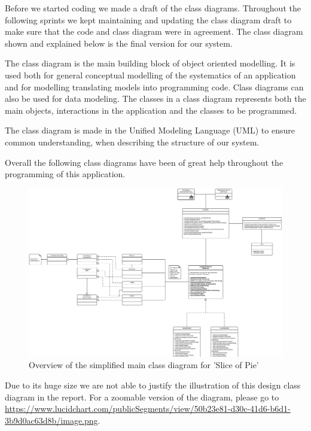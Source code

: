 Before we started coding we made a draft of the class diagrams. Throughout the following sprints we kept maintaining and updating the class diagram
draft to make sure that the code and class diagram were in agreement. The class diagram shown and explained below is the final version for our
system.

The class diagram is the main building block of object oriented modelling. It is used both for general conceptual modelling of the systematics 
of an application and for modelling translating models into programming code. Class diagrams can also be used for data modeling. The classes in a 
class diagram represents both the main objects, interactions in the application and the classes to be programmed.

The class diagram is made in the Unified Modeling Language (UML) to ensure common understanding, when describing the structure of our system.

Overall the following class diagrams have been of great help throughout the programming of this application.

\begin{figure}[htb]
    \begin{center}
        \includegraphics[width=1\textwidth]{Software_design/graphics/mainClassDiagram.png}
        \caption{Overview of the simplified main class diagram for 'Slice of Pie'}
        \label{fig:design-class_diagram} 
    \end{center}
\end{figure}

Due to its huge size we are not able to justify the illustration of this design class diagram in the report. For a zoomable version of the diagram, please go to 
\url{https://www.lucidchart.com/publicSegments/view/50b23e81-d30c-41d6-b6d1-3b9d0ac63d8b/image.png}.

